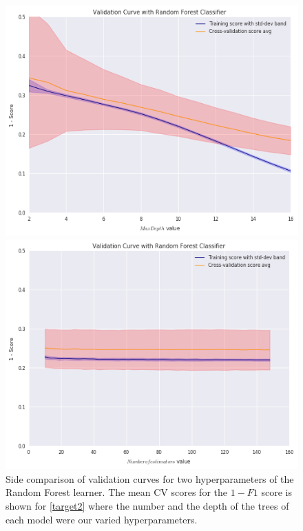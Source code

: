 \begin{figure}
\centering
\begin{minipage}{.5\textwidth}
  \includegraphics[width=.8\linewidth]{figures/random-forest/validation_curve_forest_depth_series_f1}
\end{minipage}%
\begin{minipage}{.5\textwidth}
  \includegraphics[width=.8\linewidth]{figures/random-forest/validation_curve_forest_num_trees_series_f1}
  \end{minipage}
\caption{ Side comparison of validation curves for two hyperparameters of the Random Forest learner. The mean CV scores for the $1 - F1$ score is shown for \cref{target2} where the number and the depth of the trees of each model were our varied hyperparameters.}
\label{fig:f1_random_forest_validation_curves_depth_num_trees}
\end{figure}


